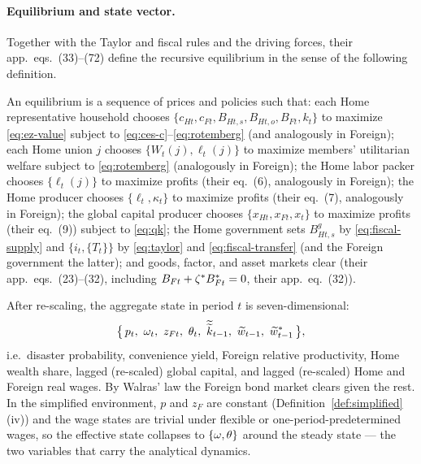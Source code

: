 \paragraph{Equilibrium and state vector.} Together with the Taylor and fiscal
rules and the driving forces, their app.\ eqs.~(33)--(72) define the recursive
equilibrium in the sense of the following definition.

\begin{definition}
\label{def:equilibrium}
An equilibrium is a sequence of prices and policies such that: each Home
representative household chooses $\{c_{Ht},c_{Ft},B_{Ht,s},B_{Ht,o},B_{Ft},k_t\}$
to maximize \eqref{eq:ez-value} subject to \eqref{eq:ces-c}--\eqref{eq:rotemberg}
(and analogously in Foreign); each Home union $j$ chooses $\{W_t(j),\ell_t(j)\}$
to maximize members' utilitarian welfare subject to \eqref{eq:rotemberg}
(analogously in Foreign); the Home labor packer chooses $\{\ell_t(j)\}$ to
maximize profits (their eq.~(6), analogously in Foreign); the Home producer
chooses $\{\ell_t,\kappa_t\}$ to maximize profits (their eq.~(7), analogously in
Foreign); the global capital producer chooses $\{x_{Ht},x_{Ft},x_t\}$ to maximize
profits (their eq.~(9)) subject to \eqref{eq:qk}; the Home government sets
$B^g_{Ht,s}$ by \eqref{eq:fiscal-supply} and $\{i_t,\{T_t\}\}$ by
\eqref{eq:taylor} and \eqref{eq:fiscal-transfer} (and the Foreign government the
latter); and goods, factor, and asset markets clear (their app.\ eqs.~(23)--(32),
including $B_{Ft}+\zeta^{*} B^{*}_{Ft}=0$, their app.\ eq.~(32)).
\end{definition}

After re-scaling, the aggregate state in period $t$ is seven-dimensional:
\begin{equation}
\label{eq:state}
\bigl\{\,p_t,\ \cy_t,\ z_{Ft},\ \theta_t,\ \widetilde{\widetilde{k}}_{t-1},\
\rs{w}_{t-1},\ \rs{w}^{*}_{t-1}\,\bigr\},
\end{equation}
i.e.\ disaster probability, convenience yield, Foreign relative productivity,
Home wealth share, lagged (re-scaled) global capital, and lagged (re-scaled) Home
and Foreign real wages. By Walras' law the Foreign bond market clears given the
rest. In the simplified environment, $p$ and $z_F$ are constant
(Definition~\ref{def:simplified}(iv)) and the wage states are trivial under
flexible or one-period-predetermined wages, so the effective state collapses to
$\{\omega,\theta\}$ around the steady state --- the two variables that carry the
analytical dynamics.

